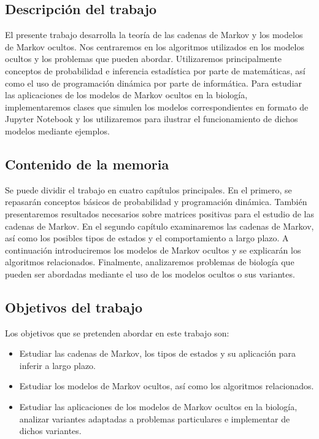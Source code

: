 \subsection*{Descripción del trabajo}
El presente trabajo desarrolla la teoría de las cadenas de Markov y los modelos de Markov ocultos. Nos centraremos en los algoritmos utilizados en los modelos ocultos y los problemas que pueden abordar. Utilizaremos principalmente conceptos de probabilidad e inferencia estadística por parte de matemáticas, así como el uso de programación dinámica por parte de informática. Para estudiar las aplicaciones de los modelos de Markov ocultos en la biología, implementaremos clases que simulen los modelos correspondientes en formato de Jupyter Notebook y los utilizaremos para ilustrar el funcionamiento de dichos modelos mediante ejemplos.    

\subsection*{Contenido de la memoria}
Se puede dividir el trabajo en cuatro capítulos principales. En el primero, se repasarán conceptos básicos de probabilidad y programación dinámica. También presentaremos resultados necesarios sobre matrices positivas para el estudio de las cadenas de Markov. En el segundo capítulo examinaremos las cadenas de Markov, así como los posibles tipos de estados y el comportamiento a largo plazo. A continuación introduciremos los modelos de Markov ocultos y se explicarán los algoritmos relacionados. Finalmente, analizaremos problemas de biología que pueden ser abordadas mediante el uso de los modelos ocultos o sus variantes.


\subsection*{Objetivos del trabajo}
Los objetivos que se pretenden abordar en este trabajo son:
\begin{itemize}
    \item Estudiar las cadenas de Markov, los tipos de estados y su aplicación para inferir a largo plazo.
    \item Estudiar los modelos de Markov ocultos, así como los algoritmos relacionados.
    \item Estudiar las aplicaciones de los modelos de Markov ocultos en la biología, analizar variantes adaptadas a problemas particulares e implementar de dichos variantes.
\end{itemize}